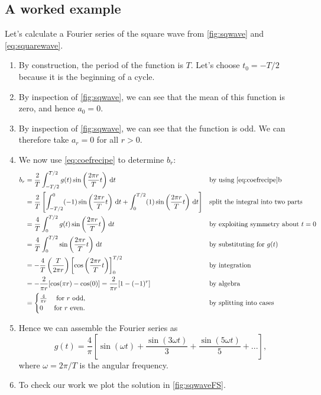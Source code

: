 \documentclass[11pt,twoside,a4paper]{article}
\begin{document}
\subsection{A worked example}

Let's calculate a Fourier series of the square wave from
\autoref{fig:sqwave} and \autoref{eq:squarewave}.
\begin{enumerate}
\item By construction, the period of the function is $T$.  Let's
  choose $t_0=-T/2$ because it is the beginning of a cycle.
\item By inspection of \autoref{fig:sqwave}, we can see that the mean
  of this function is zero, and hence $a_0=0$.
\item By inspection of \autoref{fig:sqwave}, we can see that the
  function is odd.  We can therefore take $a_r=0$ for all $r>0$.
\item We now use \autoref{eq:coefrecipe} to determine $b_r$:
  \begin{align}
    b_r &= \frac{2}{T}\int_{-T/2}^{T/2}g(t)\sin\left(\frac{2\pi
        r}{T}t\right)\,\infd t && \text{by using \autoref{eq:coefrecipe}b}\nonumber\\
    &= \frac{2}{T}\left[\int_{-T/2}^{0}(-1)\sin\left(\frac{2\pi
        r}{T}t\right)\,\infd t + \int_{0}^{T/2}(1)\sin\left(\frac{2\pi
        r}{T}t\right)\,\infd t\right] && \text{split the integral into
                                         two parts}\nonumber\\
    &= \frac{4}{T}\int_{0}^{T/2}g(t)\sin\left(\frac{2\pi
        r}{T}t\right)\,\infd t&& \text{by exploiting symmetry about $t=0$}\nonumber\\
    &= \frac{4}{T}\int_{0}^{T/2}\sin\left(\frac{2\pi
        r}{T}t\right)\,\infd t&& \text{by substituting for $g(t)$}\nonumber\\
    &= -\frac{4}{T}\left(\frac{T}{2\pi r}\right)\left[\cos\left(\frac{2\pi
          r}{T}t\right)\right]_{0}^{T/2}&& \text{by integration}\nonumber\\
    &= -\frac{2}{\pi r}[\cos(\pi r) - \cos(0)] = \frac{2}{\pi r}[1 -
    (-1)^r] && \text{by algebra}\nonumber\\
    &=
    \begin{cases}
      \frac{4}{\pi r} & \text{ for $r$ odd},\\
      0 & \text{for $r$ even}.
    \end{cases}&& \text{by splitting into cases}\nonumber
  \end{align}
\item Hence we can assemble the Fourier series as 
  \begin{displaymath}
    g(t) = \frac{4}{\pi}\left[\sin(\omega t) + \frac{\sin(3\omega
        t)}{3} + \frac{\sin(5\omega t)}{5} + ...\right],
  \end{displaymath}
  where $\omega = 2\pi/T$ is the angular frequency.
\item To check our work we plot the solution in 
  \autoref{fig:sqwaveFS}.
\end{enumerate}
\end{document}
